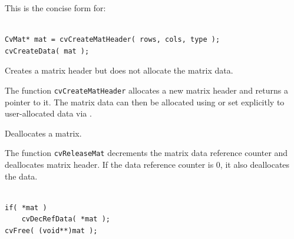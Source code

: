 This is the concise form for:

\begin{lstlisting}

CvMat* mat = cvCreateMatHeader( rows, cols, type );
cvCreateData( mat );

\end{lstlisting}

\label{CreateMatHeader}

Creates a matrix header but does not allocate the matrix data.


\begin{description}
\end{description}

The function \texttt{cvCreateMatHeader} allocates a new matrix header and returns a pointer to it. The matrix data can then be allocated using  or set explicitly to user-allocated data via .


\label{ReleaseMat}

Deallocates a matrix.


\begin{description}
\end{description}


The function \texttt{cvReleaseMat} decrements the matrix data reference counter and deallocates matrix header. If the data reference counter is 0, it also deallocates the data.

\begin{lstlisting}

if( *mat )
    cvDecRefData( *mat );
cvFree( (void**)mat );

\end{lstlisting}


\label{InitMatHeader}

